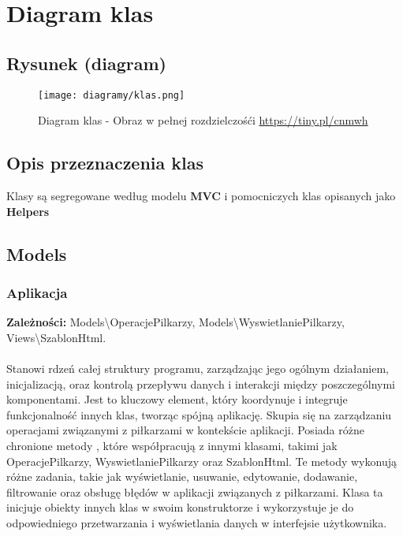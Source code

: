 \section{Diagram klas}

\subsection{Rysunek (diagram)}
\begin{figure}[!htb]
    \centering
    \texttt{[image: diagramy/klas.png]}
    \caption{Diagram klas - Obraz w pełnej rozdzielczośći \url{https://tiny.pl/cnmwh}}                
\end{figure}

\subsection{Opis przeznaczenia klas}
    Klasy są segregowane według modelu \textbf{MVC} i pomocniczych klas opisanych jako \textbf{Helpers}

\subsection{Models}
    \subsubsection{Aplikacja}

    \textbf{Zależności: } 
    Models\textbackslash{}OperacjePilkarzy, 
    Models\textbackslash{}WyswietlaniePilkarzy, 
    Views\textbackslash{}SzablonHtml.\\\\
    
    Stanowi rdzeń całej struktury programu, zarządzając jego ogólnym działaniem, inicjalizacją, oraz kontrolą przepływu danych i interakcji między poszczególnymi komponentami. Jest to kluczowy element, który koordynuje i integruje funkcjonalność innych klas, tworząc spójną aplikację.
    Skupia się na zarządzaniu operacjami związanymi z piłkarzami w kontekście aplikacji. Posiada różne chronione metody , które współpracują z innymi klasami, takimi jak OperacjePilkarzy, WyswietlaniePilkarzy oraz SzablonHtml. Te metody wykonują różne zadania, takie jak wyświetlanie, usuwanie, edytowanie, dodawanie, filtrowanie oraz obsługę błędów w aplikacji związanych z piłkarzami. Klasa ta inicjuje obiekty innych klas w swoim konstruktorze i wykorzystuje je do odpowiedniego przetwarzania i wyświetlania danych w interfejsie użytkownika.\\

